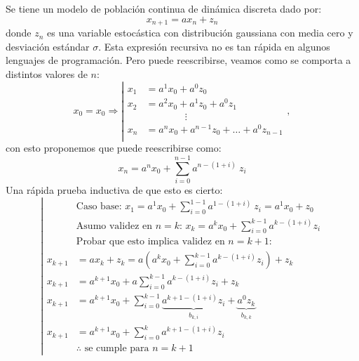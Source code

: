 \documentclass[twocolumn,aps,prl]{revtex4-1}
\begin{document}
Se tiene un modelo de población continua de dinámica discreta dado por:
\begin{equation}\label{ec:map01}
  x_{n+1} = a x_n + z_n
\end{equation}
donde $z_n$ es una variable estocástica con distribución gaussiana con media cero y desviación estándar $\sigma$. Esta expresión recursiva no es tan rápida en algunos lenguajes de programación. Pero puede reescribirse, veamos como se comporta a distintos valores de $n$:
\begin{equation}\label{ec:map01-evaluations}
  x_0 = x_0 \Rightarrow
  \left\vert\begin{aligned}
    x_1 &= a^1 x_0 + a^0 z_0 \\
    x_2 &= a^2 x_0 + a^1 z_0 + a^0 z_1 \\
        & \qquad \qquad \vdots \\
    x_n &= a^n x_0 + a^{n-1} z_0 + \ldots + a^0 z_{n-1}\\
  \end{aligned}\right. , 
\end{equation}
con esto proponemos que puede reescribirse como:
\begin{equation}\label{ec:map01-r}
  x_n = a^{n} x_0 + \sum_{i=0}^{n-1} a^{n-(1+i)} \ z_i
\end{equation}
Una rápida prueba inductiva de que esto es cierto:
$$
\left|
\begin{aligned}
  & \text{Caso base: } x_1 = a^{1} x_0 + \sum_{i=0}^{1-1} a^{1-(1+i)} \ z_i = a^{1} x_0 +z_0\\
  & \text{Asumo validez en $n=k$: } x_k = a^{k} x_0 + \sum_{i=0}^{k-1} a^{k-(1+i)} z_i\\
  & \text{Probar que esto implica validez en $n=k+1$:} \\
  x_{k+1} &= a x_k + z_k = a (a^{k} x_0 + \sum_{i=0}^{k-1} a^{k-(1+i)} z_i) + z_k \\
  x_{k+1} &= a^{k+1} x_0 + a\sum_{i=0}^{k-1} a^{k-(1+i)} z_i + z_k \\
  x_{k+1} &= a^{k+1} x_0 + \sum_{i=0}^{k-1} \underbrace{a^{k+1-(1+i)} z_i}_{b_{k,i}} + \underbrace{a^0 z_k}_{b_{k,k}} \\
  x_{k+1} &= a^{k+1} x_0 + \sum_{i=0}^{k} a^{k+1-(1+i)} z_i \\
  & \text{$\therefore$ se cumple para $n=k+1$}
\end{aligned}
\right.
$$
\end{document}
